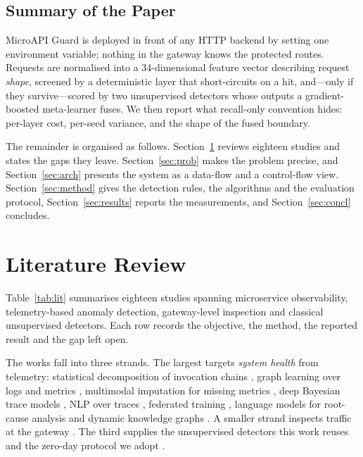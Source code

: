 \documentclass[conference]{IEEEtran}
\begin{document}
\subsection{Summary of the Paper}
MicroAPI Guard is deployed in front of any HTTP backend by setting one environment variable;
nothing in the gateway knows the protected routes. Requests are normalised into a
34-dimensional feature vector describing request \emph{shape}, screened by a deterministic
layer that short-circuits on a hit, and---only if they survive---scored by two unsupervised
detectors whose outputs a gradient-boosted meta-learner fuses. We then report what recall-only
convention hides: per-layer cost, per-seed variance, and the shape of the fused boundary.

The remainder is organised as follows. Section~\ref{sec:lit} reviews eighteen studies
and states the gaps they leave. Section~\ref{sec:prob} makes the problem precise, and
Section~\ref{sec:arch} presents the system as a data-flow and a control-flow view.
Section~\ref{sec:method} gives the detection rules, the algorithms and the evaluation
protocol, Section~\ref{sec:results} reports the measurements, and Section~\ref{sec:concl}
concludes.

\section{Literature Review}
\label{sec:lit}
Table~\ref{tab:lit} summarises eighteen studies spanning microservice observability,
telemetry-based anomaly detection, gateway-level inspection and classical unsupervised
detectors. Each row records the objective, the method, the reported result and the gap left
open.

The works fall into three strands. The largest targets \emph{system health} from telemetry:
statistical decomposition of invocation chains \cite{jin2020rpca}, graph learning over logs
and metrics \cite{liu2024lmgd}, multimodal imputation for missing metrics
\cite{zhang2026admm}, deep Bayesian trace models \cite{liu2020traceanomaly}, NLP over traces
\cite{kohyarnejadfard2022nlp}, federated training \cite{raeiszadeh2025artfl}, language models
for root-cause analysis \cite{pedroso2025llm} and dynamic knowledge graphs \cite{moens2026kg}.
A smaller strand inspects traffic at the gateway \cite{sowmya2023api}\cite{huang2026gateway}
\cite{levi2026mrg}\cite{markande2026saas}. The third supplies the unsupervised detectors this
work reuses \cite{alshehari2023insider}\cite{sadaf2020autoif}\cite{mahmoud2025dsem} and the
zero-day protocol we adopt \cite{alam2025adaptive}.
\end{document}
